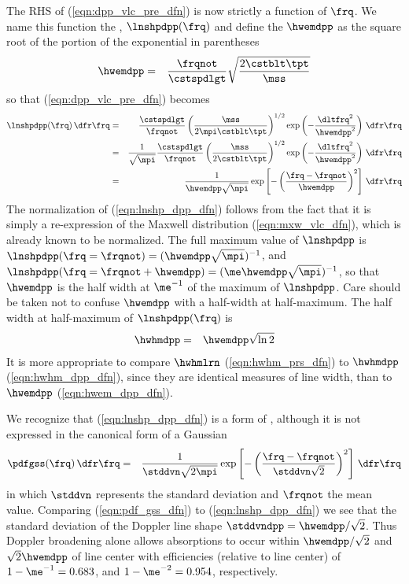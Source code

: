 \documentclass[12pt]{article}
\begin{document}
The RHS of (\ref{eqn:dpp_vlc_pre_dfn}) is now strictly a function
of $\frq$.
We name this function the ,
$\lnshpdpp(\frq)$ and define the  $\hwemdpp$
as the square root of the portion of the exponential in parentheses 
\begin{eqnarray}
\hwemdpp
& = & 
\frac{\frqnot}{\cstspdlgt} 
\sqrt{ \frac{2 \cstblt \tpt}{\mss} }
\label{eqn:hwem_dpp_dfn}
\end{eqnarray}
so that (\ref{eqn:dpp_vlc_pre_dfn}) becomes
\begin{eqnarray}
\lnshpdpp(\frq) \,\dfr\frq & = & 
\frac{\cstspdlgt}{\frqnot} \left( \frac{\mss}{2\mpi \cstblt \tpt} \right)^{1/2} 
\exp \left( -\frac{\dltfrq^{2}}{\hwemdpp^{2}} \right) \,\dfr\frq \nonumber \\ 
& = & 
\frac{1}{\sqrt{\mpi}} \frac{\cstspdlgt}{\frqnot}
\left( \frac{\mss}{2 \cstblt \tpt} \right)^{1/2} 
\exp \left( -\frac{\dltfrq^{2}}{\hwemdpp^{2}} \right) \,\dfr\frq \nonumber \\ 
& = & 
\frac{1}{\hwemdpp \sqrt{\mpi}}
\exp \left[ - \left( \frac{\frq-\frqnot}{\hwemdpp} \right)^{2} \right] \,\dfr\frq
\label{eqn:lnshp_dpp_dfn}
\end{eqnarray}
The normalization of (\ref{eqn:lnshp_dpp_dfn}) follows from the fact
that it is simply a re-expression of the Maxwell distribution
(\ref{eqn:mxw_vlc_dfn}), which is already known to be normalized.
The full maximum value of $\lnshpdpp$ is 
$\lnshpdpp(\frq = \frqnot) = (\hwemdpp \sqrt{\mpi})^{-1}$, and 
$\lnshpdpp(\frq = \frqnot + \hwemdpp) = (\me \hwemdpp
\sqrt{\mpi})^{-1}$, so that $\hwemdpp$ is the half width at $\me^{-1}$
of the maximum of $\lnshpdpp$.
Care should be taken not to confuse $\hwemdpp$ with a half-width at 
half-maximum.
The half width at half-maximum of $\lnshpdpp(\frq)$ is 
\begin{eqnarray}
\hwhmdpp & = & \hwemdpp \sqrt{\ln 2}
\label{eqn:hwhm_dpp_dfn}
\end{eqnarray}
It is more appropriate to compare $\hwhmlrn$ (\ref{eqn:hwhm_prs_dfn})
to $\hwhmdpp$ (\ref{eqn:hwhm_dpp_dfn}), since they are identical
measures of line width, than to $\hwemdpp$ (\ref{eqn:hwem_dpp_dfn}).

We recognize that (\ref{eqn:lnshp_dpp_dfn}) is a form of
, although it is not expressed in the
canonical form of a Gaussian
\begin{eqnarray}
\pdfgss(\frq) \,\dfr\frq & = & 
\frac{1}{\stddvn \sqrt{2\mpi}}
\exp \left[ - \left( \frac{\frq-\frqnot}{\stddvn \sqrt{2}} \right)^{2} \right] \,\dfr\frq
\label{eqn:pdf_gss_dfn}
\end{eqnarray}
in which $\stddvn$ represents the standard deviation and $\frqnot$ the
mean value.
Comparing (\ref{eqn:pdf_gss_dfn}) to (\ref{eqn:lnshp_dpp_dfn}) we see
that the standard deviation of the Doppler line shape $\stddvndpp =
\hwemdpp/\sqrt{2}$.
Thus Doppler broadening alone allows absorptions to occur within
$\hwemdpp/\sqrt{2}$ and $\sqrt{2}\hwemdpp$ of line center with
efficiencies (relative to line center) of $1-\me^{-1} = 0.683$, 
and $1-\me^{-2} = 0.954$, respectively.
\end{document}
